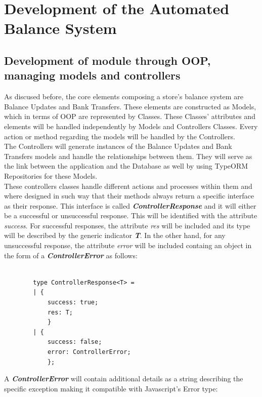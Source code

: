 \chapter{Development of the Automated Balance System}

\section{Development of module through OOP, managing models and controllers}

As discused before, the core elements composing a store's balance system are Balance Updates and Bank Transfers. These elements are constructed as Models, which in terms of OOP are represented by Classes. These Classes' attributes and elements will be handled independently by Models and Controllers Classes. Every action or method regarding the models will be handled by the Controllers.\\

The Controllers will generate instances of the Balance Updates and Bank Transfers models and handle the relationships between them. They will serve as the link between the application and the Database as well by using TypeORM Repositories for these Models.\\

These controllers classes handle different actions and processes within them and where designed in such way that their methods always return a specific interface as their response. This interface is called \textbf{\textit{ControllerResponse}} and it will either be a successful or unsuccessful response. This will be identified with the attribute \textit{success}. For successful responses, the attribute \textit{res} will be included and its type will be described by the generic indicator \textbf{\textit{T}}. In the other hand, for any unsuccessful response, the attribute \textit{error} will be included containg an object in the form of a \textbf{\textit{ControllerError}} as follows:

    
    \begin{verbatim}
        
        type ControllerResponse<T> =
        | {
            success: true; 
            res: T;
            }
        | {
            success: false;
            error: ControllerError;
            };
            \end{verbatim}
            
A \textbf{\textit{ControllerError}} will contain additional details as a string describing the specific exception making it compatible with Javascript's Error type:
            
